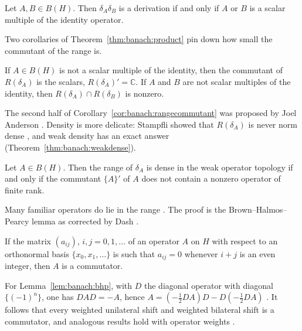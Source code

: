 \begin{theorem}\label{thm:banach:product}
Let $A,B\in B(H)$. Then $\delta_A\delta_B$ is a derivation if and only if
$A$ or $B$ is a scalar multiple of the identity operator.
\end{theorem}

Two corollaries of Theorem~\ref{thm:banach:product} pin down how small the
commutant of the range is.

\begin{corollary}\label{cor:banach:rangecommutant}
If $A\in B(H)$ is not a scalar multiple of the identity, then the
commutant of $R(\delta_A)$ is the scalars, $R(\delta_A)'=\mathbb{C}$. If
$A$ and $B$ are not scalar multiples of the identity, then
$R(\delta_A)\cap R(\delta_B)$ is nonzero.
\end{corollary}

The second half of Corollary~\ref{cor:banach:rangecommutant} was proposed
by Joel Anderson \cite[p.~275]{WilliamsJP1971Range}. Density
is more delicate: Stampfli showed that $R(\delta_A)$ is never norm dense
\cite[p.~275]{WilliamsJP1971Range}, and weak density has an exact answer (Theorem~\ref{thm:banach:weakdense}).

\begin{theorem}\label{thm:banach:weakdense}
Let $A\in B(H)$. Then the range of $\delta_A$ is dense in the weak
operator topology if and only if the commutant $\{A\}'$ of $A$ does not
contain a nonzero operator of finite rank.
\end{theorem}

Many familiar operators do lie in the range
\cite[p.~495]{Dash1975BHP}. The proof is the Brown--Halmos--Pearcy lemma
as corrected by Dash \cite[p.~495]{Dash1975BHP}.

\begin{lemma}\label{lem:banach:bhp}
If the matrix $(a_{ij})$, $i,j=0,1,\dots$ of an operator $A$ on $H$ with
respect to an orthonormal basis $\{x_0,x_1,\dots\}$ is such that
$a_{ij}=0$ whenever $i+j$ is an even integer, then $A$ is a commutator.
\end{lemma}

For Lemma~\ref{lem:banach:bhp}, with $D$ the diagonal operator with
diagonal $\{(-1)^n\}$, one has $DAD=-A$, hence $A=(-\tfrac12 DA)D -
D(-\tfrac12 DA)$ \cite[p.~495]{Dash1975BHP}. It follows that every
weighted unilateral shift and weighted bilateral shift is a commutator,
and analogous results hold with operator weights
\cite[p.~495]{Dash1975BHP}.

